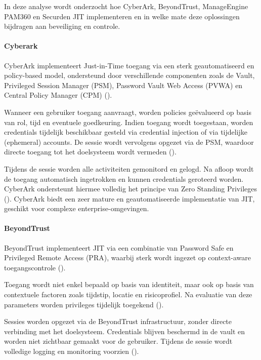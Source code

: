 In deze analyse wordt onderzocht hoe CyberArk, BeyondTrust, ManageEngine  PAM360 en Securden JIT implementeren en in welke mate deze oplossingen bijdragen aan beveiliging en controle.

\paragraph{Cyberark}
CyberArk implementeert Just-in-Time toegang via een sterk geautomatiseerd en policy-based model, ondersteund door verschillende componenten zoals de Vault, Privileged Session Manager (PSM), Password Vault Web Access (PVWA) en Central Policy Manager (CPM) (\cite{cyberark_pam_architecture,cyberark_psm}).

Wanneer een gebruiker toegang aanvraagt, worden policies geëvalueerd op basis van rol, tijd en eventuele goedkeuring. Indien toegang wordt toegestaan, worden credentials tijdelijk beschikbaar gesteld via credential injection of via tijdelijke (ephemeral) accounts. De sessie wordt vervolgens opgezet via de PSM, waardoor directe toegang tot het doelsysteem wordt vermeden (\cite{cyberark_psm,cyberark_pam_architecture}).

Tijdens de sessie worden alle activiteiten gemonitord en gelogd. Na afloop wordt de toegang automatisch ingetrokken en kunnen credentials geroteerd worden. CyberArk ondersteunt hiermee volledig het principe van Zero Standing Privileges (\cite{cyberark_psm,nist2020}).
CyberArk biedt een zeer mature en geautomatiseerde implementatie van JIT, geschikt voor complexe enterprise-omgevingen.
\paragraph{BeyondTrust}
BeyondTrust implementeert JIT via een combinatie van Password Safe en Privileged Remote Access (PRA), waarbij sterk wordt ingezet op context-aware toegangscontrole (\cite{beyondtrust_passwordsafe,beyondtrust_architecture}).

Toegang wordt niet enkel bepaald op basis van identiteit, maar ook op basis van contextuele factoren zoals tijdstip, locatie en risicoprofiel. Na evaluatie van deze parameters worden privileges tijdelijk toegekend (\cite{beyondtrust_authentication}).

Sessies worden opgezet via de BeyondTrust infrastructuur, zonder directe verbinding met het doelsysteem. Credentials blijven beschermd in de vault en worden niet zichtbaar gemaakt voor de gebruiker. Tijdens de sessie wordt volledige logging en monitoring voorzien (\cite{beyondtrust_passwordsafe,beyondtrust_architecture}).

